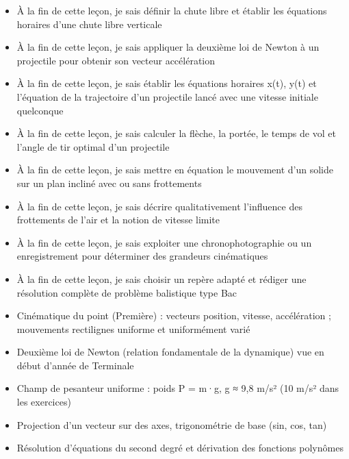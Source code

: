 \documentclass[11pt]{article}
\begin{document}
\begin{objectifs}
\begin{itemize}
\item À la fin de cette leçon, je sais définir la chute libre et établir les équations horaires d'une chute libre verticale
\item À la fin de cette leçon, je sais appliquer la deuxième loi de Newton à un projectile pour obtenir son vecteur accélération
\item À la fin de cette leçon, je sais établir les équations horaires x(t), y(t) et l'équation de la trajectoire d'un projectile lancé avec une vitesse initiale quelconque
\item À la fin de cette leçon, je sais calculer la flèche, la portée, le temps de vol et l'angle de tir optimal d'un projectile
\item À la fin de cette leçon, je sais mettre en équation le mouvement d'un solide sur un plan incliné avec ou sans frottements
\item À la fin de cette leçon, je sais décrire qualitativement l'influence des frottements de l'air et la notion de vitesse limite
\item À la fin de cette leçon, je sais exploiter une chronophotographie ou un enregistrement pour déterminer des grandeurs cinématiques
\item À la fin de cette leçon, je sais choisir un repère adapté et rédiger une résolution complète de problème balistique type Bac
\end{itemize}
\end{objectifs}

\begin{prerequis}
\begin{itemize}
\item Cinématique du point (Première) : vecteurs position, vitesse, accélération ; mouvements rectilignes uniforme et uniformément varié
\item Deuxième loi de Newton (relation fondamentale de la dynamique) vue en début d'année de Terminale
\item Champ de pesanteur uniforme : poids P = m·g, g ≈ 9,8 m/s² (10 m/s² dans les exercices)
\item Projection d'un vecteur sur des axes, trigonométrie de base (sin, cos, tan)
\item Résolution d'équations du second degré et dérivation des fonctions polynômes
\end{itemize}
\end{prerequis}
\end{document}
